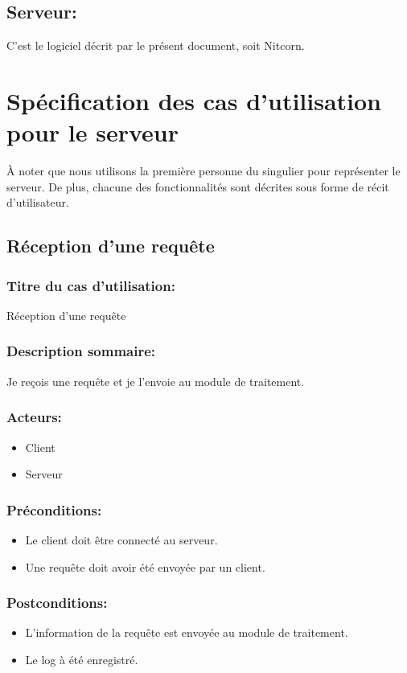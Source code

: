 \documentclass{scrreprt}
\begin{document}
\subsection{Serveur:} C'est le logiciel décrit par le présent document, soit Nitcorn.

\section{Spécification des cas d'utilisation pour le serveur} 
À noter que nous utilisons la première personne du singulier pour représenter le serveur. De plus, chacune des fonctionnalités sont décrites sous forme de récit d'utilisateur.
\subsection{Réception d'une requête}
\subsubsection{Titre du cas d'utilisation:} Réception d'une requête
\subsubsection{Description sommaire:} Je reçois une requête et je l'envoie au module de traitement.
\subsubsection{Acteurs:}
\begin{itemize}
    \item Client
    \item Serveur
\end{itemize}
\subsubsection{Préconditions:}
\begin{itemize}
	\item Le client doit être connecté au serveur.
    \item Une requête doit avoir été envoyée par un client.
\end{itemize} 
\subsubsection{Postconditions:}
\begin{itemize}
    \item  L'information de la requête est envoyée au module de traitement.
    \item  Le log à été enregistré.
\end{itemize} 
\end{document}
